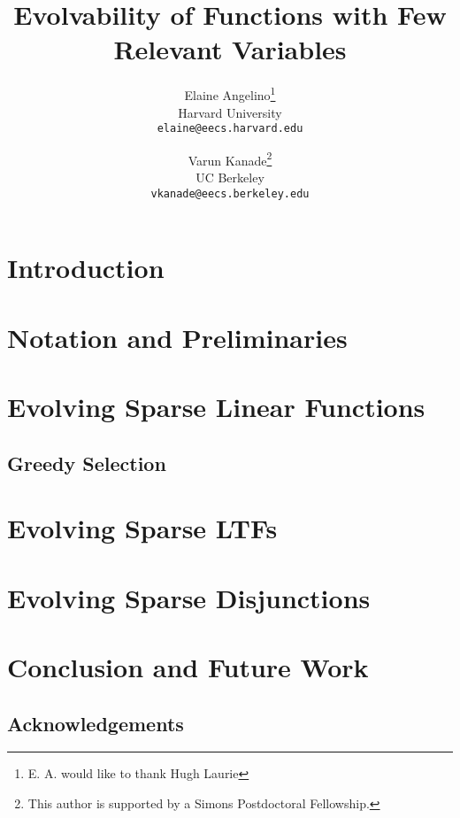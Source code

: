 \documentclass[11pt]{article}
\begin{document}
\title{Evolvability of Functions with Few Relevant Variables}
\author{Elaine Angelino\thanks{E. A. would like to thank Hugh Laurie} \\
Harvard University \\ \texttt{elaine@eecs.harvard.edu} \and Varun
Kanade\thanks{This author is supported by a Simons Postdoctoral Fellowship.} \\
UC Berkeley \\ \texttt{vkanade@eecs.berkeley.edu}}

\maketitle

\begin{abstract}

\end{abstract}

\section{Introduction}


\section{Notation and Preliminaries}


\section{Evolving Sparse Linear Functions}


\subsection{Greedy Selection}


\section{Evolving Sparse LTFs}


\section{Evolving Sparse Disjunctions}


\section{Conclusion and Future Work}


\subsection*{Acknowledgements} 


\nocite{*}

\end{document}
